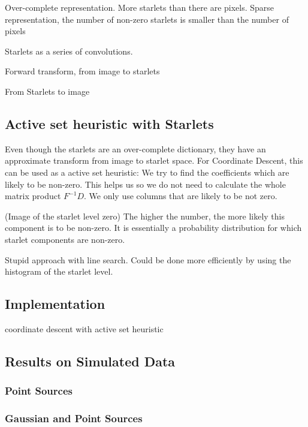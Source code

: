 Over-complete representation. More starlets than there are pixels. Sparse representation, the number of non-zero starlets is smaller than the number of pixels

Starlets as a series of convolutions.

Forward transform, from image to starlets

From Starlets to image

\subsection{Active set heuristic with Starlets}\label{cd:heuristic}
Even though the starlets are an over-complete dictionary, they have an approximate transform from image to starlet space. For Coordinate Descent, this can be used as a active set heuristic: We try to find the coefficients which are likely to be non-zero. This helps us so we do not need to calculate the whole matrix product $F^{-1}D$. We only use columns that are likely to be not zero.

(Image of the starlet level zero)
The higher the number, the more likely this component is to be non-zero. It is essentially a probability distribution for which starlet components are non-zero.

Stupid approach with line search. Could be done more efficiently by using the histogram of the starlet level.

\subsection{Implementation}
coordinate descent with active set heuristic


\subsection{Results on Simulated Data}

\subsubsection{Point Sources}

\subsubsection{Gaussian and Point Sources}

